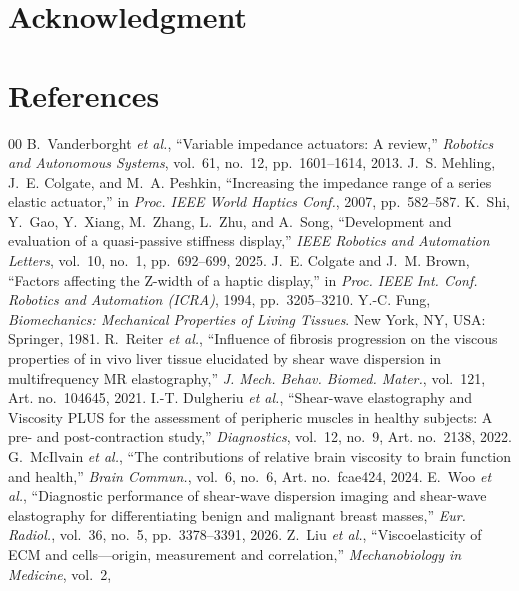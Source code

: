 ﻿\documentclass[conference]{IEEEtran}
\begin{document}
\section*{Acknowledgment}

\section*{References}
\begin{thebibliography}{00}
B.~Vanderborght \emph{et al.}, ``Variable impedance actuators: A review,''
\emph{Robotics and Autonomous Systems}, vol.~61, no.~12, pp.~1601--1614, 2013.
J.~S. Mehling, J.~E. Colgate, and M.~A. Peshkin, ``Increasing the impedance
range of a series elastic actuator,'' in \emph{Proc. IEEE World Haptics
Conf.}, 2007, pp.~582--587.
K.~Shi, Y.~Gao, Y.~Xiang, M.~Zhang, L.~Zhu, and A.~Song, ``Development and
evaluation of a quasi-passive stiffness display,'' \emph{IEEE Robotics and
Automation Letters}, vol.~10, no.~1, pp.~692--699, 2025.
J.~E. Colgate and J.~M. Brown, ``Factors affecting the Z-width of a haptic
display,'' in \emph{Proc. IEEE Int. Conf. Robotics and Automation (ICRA)},
1994, pp.~3205--3210.
Y.-C. Fung, \emph{Biomechanics: Mechanical Properties of Living Tissues}.
New York, NY, USA: Springer, 1981.
R.~Reiter \emph{et al.}, ``Influence of fibrosis progression on the viscous
properties of in vivo liver tissue elucidated by shear wave dispersion in
multifrequency MR elastography,'' \emph{J. Mech. Behav. Biomed. Mater.},
vol.~121, Art. no.~104645, 2021.
I.-T. Dulgheriu \emph{et al.}, ``Shear-wave elastography and Viscosity PLUS
for the assessment of peripheric muscles in healthy subjects: A pre- and
post-contraction study,'' \emph{Diagnostics}, vol.~12, no.~9, Art. no.~2138,
2022.
G.~McIlvain \emph{et al.}, ``The contributions of relative brain viscosity
to brain function and health,'' \emph{Brain Commun.}, vol.~6, no.~6, Art.
no.~fcae424, 2024.
E.~Woo \emph{et al.}, ``Diagnostic performance of shear-wave dispersion
imaging and shear-wave elastography for differentiating benign and malignant
breast masses,'' \emph{Eur. Radiol.}, vol.~36, no.~5, pp.~3378--3391, 2026.
Z.~Liu \emph{et al.}, ``Viscoelasticity of ECM and cells---origin,
measurement and correlation,'' \emph{Mechanobiology in Medicine}, vol.~2,

\end{thebibliography}
\end{document}

